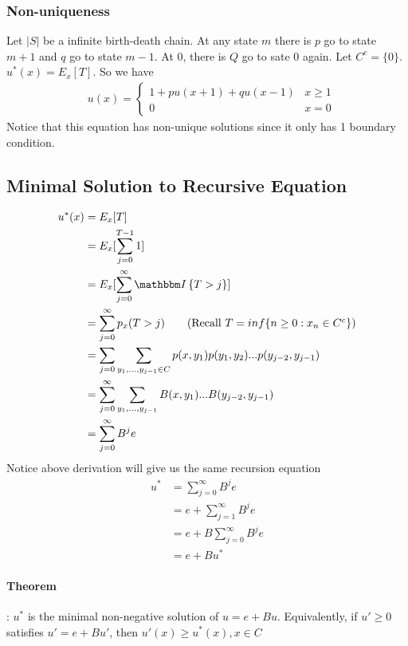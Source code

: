 \subsubsection{Non-uniqueness}
Let $|S|$ be a infinite birth-death chain. At any state $m$ there is $p$ go to state $m+1$ and $q$ go to state $m-1$. At 0, there is $Q$ go to sate $0$ again. Let $C^c = \{ 0 \} $. $u^*(x) = E_x[T]$. So we have 
    \begin{align*}
        & u(x) =
            \begin{cases}
             1 + p u(x+1) + qu(x-1) & x \geq 1 \\
             0 & x = 0
            \end{cases}
    \end{align*}
Notice that this equation has non-unique solutions since it only has 1 boundary condition. 



\subsection{Minimal Solution to Recursive Equation} 
\begin{align*}
    u^*(x) 
    & = E_x[T] \\
    & = E_x[\sum_{j=0}^{T-1} 1] \\
    & = E_x[\sum_{j=0}^\infty \indic{T > j}] \\
    & = \sum_{j=0}^\infty p_x(T > j) \tag{Recall $T = inf\{n \geq 0: x_n \in C^c\}$}\\
    & = \sum_{j=0} \sum_{y_1, ..., y_{j-1}\in C}p(x,y_1)p(y_1,y_2)...p(y_{j-2},y_{j-1})\\
    & = \sum_{j=0}^\infty  \sum_{y_1, ..., y_{j-1}} B(x,y_1)...B(y_{j-2}, y_{j-1})\\
    & = \sum_{j=0}^\infty B^j e
\end{align*}
Notice above derivation will give us the same recursion equation 
    \begin{align*}
        u^*
        & = \sum_{j=0}^\infty B^j e\\
        & = e + \sum_{j=1}^\infty B^j e \\
        & = e + B \sum_{j=0}^\infty B^j e\\
        & = e + B u^*
    \end{align*}
\paragraph{Theorem}: $u^*$ is the minimal non-negative solution of $u = e + B u$. Equivalently, if $u'\geq 0$ satisfies $u' = e + Bu'$, then $u'(x) \geq u^*(x), x\in C$

